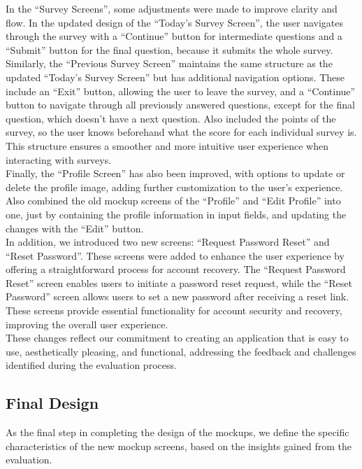 In the ``Survey Screens'', some adjustments were made to improve clarity and flow. In the updated design of the ``Today's Survey Screen'', the user navigates through the survey with a ``Continue'' button for intermediate questions and a ``Submit'' button for the final question, because it submits the whole survey. Similarly, the ``Previous Survey Screen'' maintains the same structure as the updated ``Today's Survey Screen'' but has additional navigation options. These include an ``Exit'' button, allowing the user to leave the survey, and a ``Continue'' button to navigate through all previously answered questions, except for the final question, which doesn't have a next question. Also included the points of the survey, so the user knows beforehand what the score for each individual survey is. This structure ensures a smoother and more intuitive user experience when interacting with surveys.\vspace{5mm} \\
Finally, the ``Profile Screen'' has also been improved, with options to update or delete the profile image, adding further customization to the user’s experience. Also combined the old mockup screens of the ``Profile'' and ``Edit Profile'' into one, just by containing the profile information in input fields, and updating the changes with the ``Edit'' button.\vspace{5mm} \\
In addition, we introduced two new screens: ``Request Password Reset'' and ``Reset Password''. These screens were added to enhance the user experience by offering a straightforward process for account recovery. The ``Request Password Reset'' screen enables users to initiate a password reset request, while the ``Reset Password'' screen allows users to set a new password after receiving a reset link. These screens provide essential functionality for account security and recovery, improving the overall user experience.
\vspace{5mm} \\
These changes reflect our commitment to creating an application that is easy to use, aesthetically pleasing, and functional, addressing the feedback and challenges identified during the evaluation process.

\subsection{Final Design}

As the final step in completing the design of the mockups, we define the specific characteristics of the new mockup screens, based on the insights gained from the evaluation. \\


